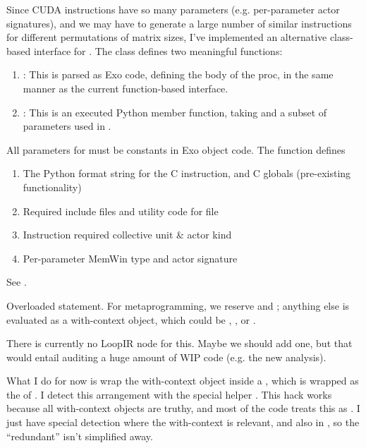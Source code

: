 \filbreak
{} Since CUDA instructions have so many parameters (e.g. per-parameter actor signatures), and we may have to generate a large number of similar instructions for different permutations of matrix sizes, I've implemented an alternative class-based interface for .
The class defines two meaningful functions:
\begin{enumerate}
  \item {}: This is parsed as Exo code, defining the body of the  proc, in the same manner as the current function-based  interface.
  \filbreak
  \item {}: This is an executed Python member function, taking  and a subset of parameters used in .
\end{enumerate}

\filbreak
All parameters for  must be constants in Exo object code.
The  function defines
\begin{enumerate}
  \item The Python format string for the C instruction, and C globals (pre-existing  functionality)
  \filbreak
  \item Required include files and utility code for  file
  \filbreak
  \item Instruction required collective unit \& actor kind
  \filbreak
  \item Per-parameter MemWin type and actor signature
\end{enumerate}

\filbreak
See .

\filbreak
{} Overloaded  statement.
For metaprogramming, we reserve  and ;
anything else is evaluated as a with-context object, which could be , , or .

\filbreak
There is currently no LoopIR node for this.
Maybe we should add one, but that would entail auditing a huge amount of WIP code (e.g. the new analysis).

\filbreak
What I do for now is wrap the with-context object inside a , which is wrapped as the  of .
I detect this arrangement with the special helper .
This hack works because all with-context objects are truthy, and most of the code treats this as .
I just have special detection where the with-context is relevant, and also in , so the ``redundant''  isn't simplified away.

